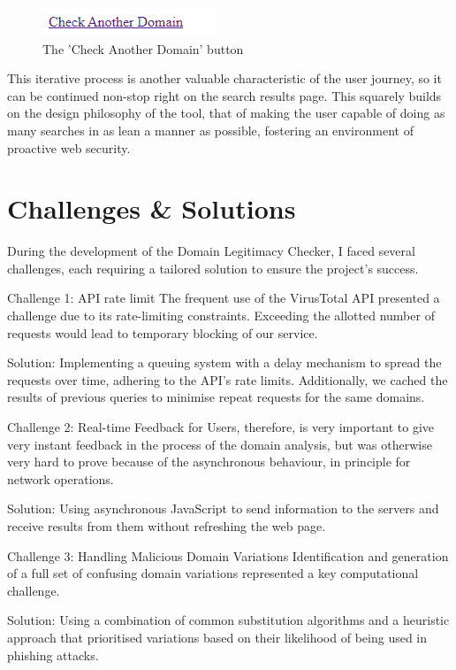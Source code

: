 \begin{figure}[H]
    \centering
    \includegraphics[width=0.3\linewidth]{project/ii.png}
    \caption{The 'Check Another Domain' button}
    \label{fig:enter-label}
\end{figure}

This iterative process is another valuable characteristic of the user journey, so it can be continued non-stop right on the search results page. This squarely builds on the design philosophy of the tool, that of making the user capable of doing as many searches in as lean a manner as possible, fostering an environment of proactive web security.




\section{Challenges \& Solutions}

During the development of the Domain Legitimacy Checker, I faced several challenges, each requiring a tailored solution to ensure the project's success.

Challenge 1: API rate limit
The frequent use of the VirusTotal API presented a challenge due to its rate-limiting constraints. Exceeding the allotted number of requests would lead to temporary blocking of our service.

Solution: Implementing a queuing system with a delay mechanism to spread the requests over time, adhering to the API's rate limits. Additionally, we cached the results of previous queries to minimise repeat requests for the same domains.

Challenge 2: Real-time Feedback for Users, therefore, is very important to give very instant feedback in the process of the domain analysis, but was otherwise very hard to prove because of the asynchronous behaviour, in principle for network operations.

Solution: Using asynchronous JavaScript to send information to the servers and receive results from them without refreshing the web page. 

Challenge 3: Handling Malicious Domain Variations
Identification and generation of a full set of confusing domain variations represented a key computational challenge.

Solution: Using a combination of common substitution algorithms and a heuristic approach that prioritised variations based on their likelihood of being used in phishing attacks. 

